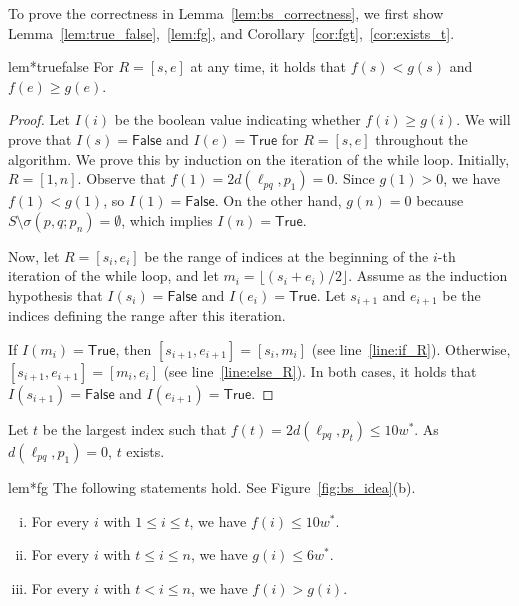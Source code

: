 \documentclass[10pt,a4paper]{article}
\theoremstyle{star}
\theoremstyle{claimstar}
\newcommand{\true}{\textsf{True}\xspace}
\newcommand{\false}{\textsf{False}\xspace}
\begin{document}
To prove the correctness in Lemma~\ref{lem:bs_correctness}, we first show Lemma~\ref{lem:true_false},~\ref{lem:fg}, and Corollary~\ref{cor:fgt},~\ref{cor:exists_t}.






\begin{restatable}{lem*}{truefalse}
    \label{lem:true_false}
    For $R = [s, e]$ at any time, it holds that $f(s)< g(s)$ and $f(e) \ge g(e)$.
\end{restatable}


\begin{proof}
    Let $I(i)$ be the boolean value indicating whether $f(i) \ge g(i)$.
    We will prove that $I(s) = \false$ and $I(e) = \true$ for $R = [s, e]$ throughout the algorithm.
    We prove this by induction on the iteration of the while loop.
    Initially, $R = [1, n]$.
    Observe that $f(1) = 2d(\ell_{pq}, p_1) = 0$.
    Since $g(1) > 0$, we have $f(1) < g(1)$, so $I(1) = \false$.
    On the other hand, $g(n) = 0$ because $S \setminus \sigma(p, q; p_n) = \emptyset$, which implies $I(n) = \true$.
    
    Now, let $R = [s_i, e_i]$ be the range of indices at the beginning of the $i$-th iteration of the while loop, and let $m_i = \lfloor (s_i + e_i)/2 \rfloor$.
    Assume as the induction hypothesis that $I(s_i) = \false$ and $I(e_i) = \true$.
    Let $s_{i+1}$ and $e_{i+1}$ be the indices defining the range after this iteration.
    
    If $I(m_i) = \true$, then $[s_{i+1}, e_{i+1}] = [s_i, m_i]$ (see line~\ref{line:if_R}).
    Otherwise, $[s_{i+1}, e_{i+1}] = [m_i, e_i]$ (see line~\ref{line:else_R}).
    In both cases, it holds that $I(s_{i+1}) = \false$ and $I(e_{i+1}) = \true$.
\end{proof}


Let $t$ be the largest index such that $f(t) = 2d(\ell_{pq}, p_t) \le 10w^*$.
As $d(\ell_{pq}, p_1) = 0$, $t$ exists.

\begin{restatable}{lem*}{fg}
    \label{lem:fg}
    The following statements hold. See Figure~\ref{fig:bs_idea}(b).
    \begin{enumerate}[(i)]
        \item For every $i$ with $1\le i \le t$, we have $f(i) \le 10w^*$. 
        \item For every $i$ with $t\le i \le n$, 
    we have $g(i) \le 6w^*$. 
        \item For every $i$ with $t < i \le n$, we have $f(i) > g(i)$. 
    \end{enumerate}
\end{restatable}
\end{document}
